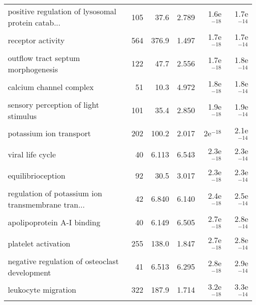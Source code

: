 \begin{longtable}{lrrrrr}
 positive regulation of lysosomal protein catab... &                     105 &                    37.6 &      2.789 &         1.6e$^{-18}$ &         1.7e$^{-14}$ \\
                                 receptor activity &                     564 &                   376.9 &      1.497 &         1.7e$^{-18}$ &         1.7e$^{-14}$ \\
                outflow tract septum morphogenesis &                     122 &                    47.7 &      2.556 &         1.7e$^{-18}$ &         1.8e$^{-14}$ \\
                           calcium channel complex &                      51 &                    10.3 &      4.972 &         1.8e$^{-18}$ &         1.8e$^{-14}$ \\
              sensory perception of light stimulus &                     101 &                    35.4 &      2.850 &         1.9e$^{-18}$ &         1.9e$^{-14}$ \\
                           potassium ion transport &                     202 &                   100.2 &      2.017 &           2e$^{-18}$ &         2.1e$^{-14}$ \\
                                  viral life cycle &                      40 &                   6.113 &      6.543 &         2.3e$^{-18}$ &         2.3e$^{-14}$ \\
                                 equilibrioception &                      92 &                    30.5 &      3.017 &         2.3e$^{-18}$ &         2.3e$^{-14}$ \\
 regulation of potassium ion transmembrane tran... &                      42 &                   6.840 &      6.140 &         2.4e$^{-18}$ &         2.5e$^{-14}$ \\
                        apolipoprotein A-I binding &                      40 &                   6.149 &      6.505 &         2.7e$^{-18}$ &         2.8e$^{-14}$ \\
                               platelet activation &                     255 &                   138.0 &      1.847 &         2.7e$^{-18}$ &         2.8e$^{-14}$ \\
     negative regulation of osteoclast development &                      41 &                   6.513 &      6.295 &         2.8e$^{-18}$ &         2.9e$^{-14}$ \\
                               leukocyte migration &                     322 &                   187.9 &      1.714 &         3.2e$^{-18}$ &         3.3e$^{-14}$ \\

\end{longtable}
